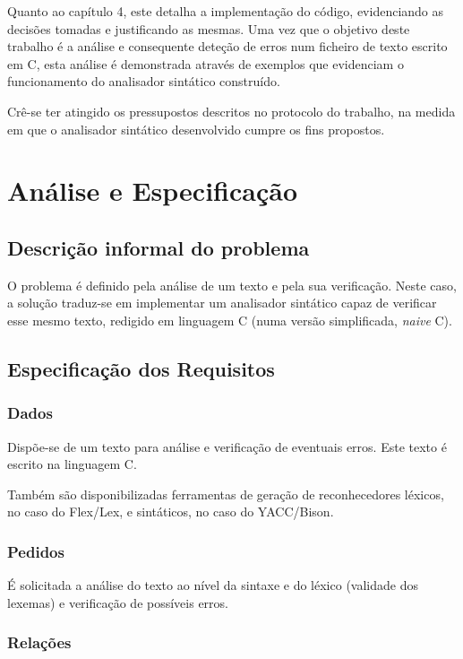 \documentclass{report}
\begin{document}
Quanto ao capítulo 4, este detalha a implementação do código, evidenciando as decisões tomadas e justificando as mesmas. Uma vez que o objetivo deste trabalho é a análise e consequente deteção de erros num ficheiro de texto escrito em C, esta análise é demonstrada através de exemplos que evidenciam o funcionamento do analisador sintático construído.

Crê-se ter atingido os pressupostos descritos no protocolo do trabalho, na medida em que o analisador sintático desenvolvido cumpre os fins propostos.

\chapter{Análise e Especificação}

\section{Descrição informal do problema}

O problema é definido pela análise de um texto e pela sua verificação. Neste caso, a solução traduz-se em implementar um analisador sintático capaz de verificar esse mesmo texto, redigido em linguagem C (numa versão simplificada, \textit{naive} C).

\section{Especificação dos Requisitos}

\subsection{Dados}

Dispõe-se de um texto para análise e verificação de eventuais erros. Este texto é escrito na linguagem C.

Também são disponibilizadas ferramentas de geração de reconhecedores léxicos, no caso do Flex/Lex, e sintáticos, no caso do YACC/Bison.

\subsection{Pedidos}

É solicitada a análise do texto ao nível da sintaxe e do léxico (validade dos lexemas) e verificação de possíveis erros.

\subsection{Relações}
\end{document}
